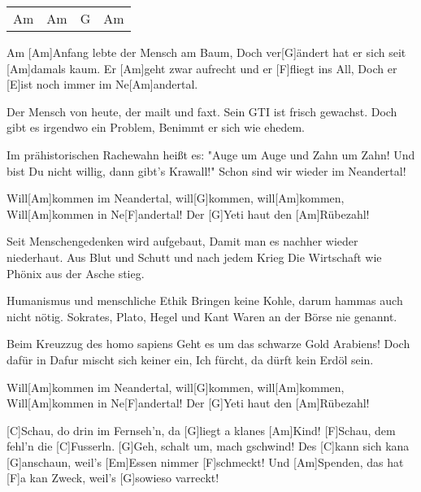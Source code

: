 

\begin{guitar}
	{\footnotesize\begin{tabular}{|l|l|l|l|}
			Am & Am & G & Am
	\end{tabular} }
	
	Am [Am]Anfang lebte der Mensch am Baum, 
	Doch ver[G]{ä}ndert hat er sich seit [Am]damals kaum.
	Er [Am]geht zwar aufrecht und er [F]fliegt ins All,
	Doch er [E]ist noch immer im Ne[Am]andertal.
	
	Der Mensch von heute, der mailt und faxt.
	Sein GTI ist frisch gewachst.
	Doch gibt es irgendwo ein Problem,
	Benimmt er sich wie ehedem.
	
	Im prähistorischen Rachewahn heißt es: 
	"Auge um Auge und Zahn um Zahn!
	Und bist Du nicht willig, dann gibt’s Krawall!"
	Schon sind wir wieder im Neandertal!
	
	\begin{highlightbar}
		Will[Am]kommen im Neandertal, will[G]kommen, will[Am]kommen,
		Will[Am]kommen in Ne[F]andertal! Der [G]Yeti haut den [Am]Rübezahl!
	\end{highlightbar}
	
	\songsection{Strophe 2}
	Seit Menschengedenken wird aufgebaut,
	Damit man es nachher wieder niederhaut.
	Aus Blut und Schutt und nach jedem Krieg
	Die Wirtschaft wie Phönix aus der Asche stieg.
	
	Humanismus und menschliche Ethik 
	Bringen keine Kohle, darum hammas auch nicht nötig.
	Sokrates, Plato, Hegel und Kant
	Waren an der Börse nie genannt.
	
	Beim Kreuzzug des homo sapiens 
	Geht es um das schwarze Gold Arabiens!
	Doch dafür in Dafur mischt sich keiner ein,
	Ich fürcht, da dürft kein Erdöl sein.
	\pagebreak
	\begin{highlightbar}
		\songsection{Refrain}
		Will[Am]kommen im Neandertal, will[G]kommen, will[Am]kommen,
		Will[Am]kommen in Ne[F]andertal! Der [G]Yeti haut den [Am]Rübezahl!
	\end{highlightbar}
	
	[C]Schau, do drin im Fernseh’n, da [G]liegt a klanes [Am]Kind!
	[F]Schau, dem fehl’n die [C]Fusserln. [G]Geh, schalt um, mach gschwind!
	Des [C]kann sich kana [G]anschaun, weil’s [Em]Essen nimmer [F]schmeckt!
	Und [Am]Spenden, das hat [F]a kan Zweck, weil’s [G]sowieso varreckt!
	

\end{guitar}
